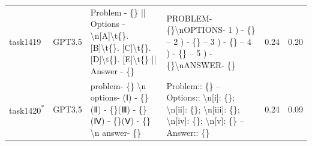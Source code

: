 \begin{longtable}{@{}p{0.8cm\tiny}p{1cm\tiny}p{4.1cm\ttfamily\tiny}p{4.1cm\ttfamily\tiny}p{0.8cm\tiny}p{0.8cm\tiny}@{}}
task1419  & GPT3.5    & Problem - \{\} || Options - \textbackslash{}n{[}A{]}\textbackslash{}t\{\}. {[}B{]}\textbackslash{}t\{\}. {[}C{]}\textbackslash{}t\{\}. {[}D{]}\textbackslash{}t\{\}. {[}E{]}\textbackslash{}t\{\} || Answer - \{\}                                                                                                                                                                                                                                                                                                      & PROBLEM- \{\}\textbackslash{}nOPTIONS-   1 ) - \{\} -- 2 ) - \{\} -- 3 ) - \{\} -- 4 ) - \{\} -- 5 ) - \{\}\textbackslash{}nANSWER- \{\}                                                                                                                                                                                                                                                                                                                                                                                                                                          & 0.24 & 0.20 \\
task1420\textsuperscript{*}  & GPT3.5    & problem- \{\} \textbackslash{}n options-   (Ⅰ) - \{\}(Ⅱ) - \{\}(Ⅲ) - \{\}(Ⅳ) - \{\}(Ⅴ) - \{\} \textbackslash{}n answer- \{\}                                                                                                                                                                                                                                                                                                                                                                                            & Problem:: \{\} -- Options::  \textbackslash{}n{[}i{]}: \{\}; \textbackslash{}n{[}ii{]}: \{\}; \textbackslash{}n{[}iii{]}: \{\}; \textbackslash{}n{[}iv{]}: \{\}; \textbackslash{}n{[}v{]}: \{\} -- Answer:: \{\}                                                                                                                                                                                                                                                                                                                                                                  & 0.24 & 0.09 \\

\end{longtable}
